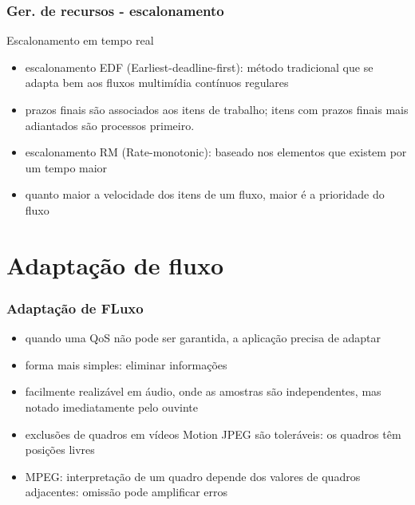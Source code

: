 \documentclass[]{beamer}
\begin{document}
\begin{frame}
  \frametitle{Ger. de recursos - escalonamento}
Escalonamento em tempo real
\begin{itemize}
  \item escalonamento EDF (Earliest-deadline-first): método tradicional que se adapta
bem aos fluxos multimídia contínuos regulares
  \item prazos finais são associados aos itens de trabalho; itens com prazos finais mais
adiantados são processos primeiro.
  \item escalonamento RM (Rate-monotonic): baseado nos elementos que existem por um tempo maior
  \item quanto maior a velocidade dos itens de um fluxo, maior é a prioridade do fluxo
\end{itemize}
\end{frame}

\section{Adaptação de fluxo}

\begin{frame}
 \frametitle{Adaptação de FLuxo}
 \begin{itemize}
   \item quando uma QoS não pode ser garantida, a aplicação precisa de adaptar
   \item forma mais simples: eliminar informações
   \item facilmente realizável em áudio, onde as amostras são independentes, mas notado
imediatamente pelo ouvinte
   \item exclusões de quadros em vídeos Motion JPEG são toleráveis: os quadros têm posições livres
   \item MPEG: interpretação de um quadro depende dos valores de quadros adjacentes: omissão
pode amplificar erros
  \end{itemize}
\end{frame}
\end{document}
